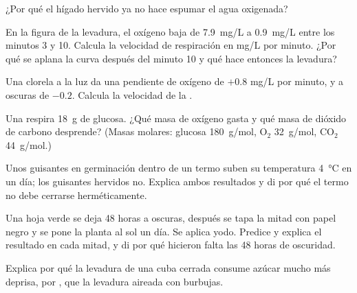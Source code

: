 \begin{exercise}[$\star$]\label{exo:g10:cell-metabolism:5}
¿Por qué el hígado hervido ya no hace espumar el agua oxigenada?
\end{exercise}

\begin{exercise}[$\star\star$]\label{exo:g10:cell-metabolism:6}
En la figura de la levadura, el oxígeno baja de \qty{7.9}{mg/L} a
\qty{0.9}{mg/L} entre los minutos 3 y 10. Calcula la velocidad de
respiración en \unit{mg/L} por minuto. ¿Por qué se aplana la curva
después del minuto 10 y qué hace entonces la levadura?
\end{exercise}

\begin{exercise}[$\star\star$]\label{exo:g10:cell-metabolism:7}
Una clorela a la luz da una pendiente de oxígeno de $+0.8$ \unit{mg/L}
por minuto, y a oscuras de $-0.2$. Calcula la velocidad de la
.
\end{exercise}

\begin{exercise}[$\star\star$]\label{exo:g10:cell-metabolism:8}
Una  respira \qty{18}{g} de glucosa. ¿Qué masa de oxígeno gasta y
qué masa de dióxido de carbono desprende? (Masas molares: glucosa
\qty{180}{g/mol}, $\mathrm{O_2}$ \qty{32}{g/mol}, $\mathrm{CO_2}$
\qty{44}{g/mol}.)
\end{exercise}

\begin{exercise}[$\star\star$]\label{exo:g10:cell-metabolism:9}
Unos guisantes en germinación dentro de un termo suben su temperatura
\qty{4}{\celsius} en un día; los guisantes hervidos no. Explica ambos
resultados y di por qué el termo no debe cerrarse herméticamente.
\end{exercise}

\begin{exercise}[$\star\star$]\label{exo:g10:cell-metabolism:10}
Una hoja verde se deja 48 horas a oscuras, después se tapa la mitad con
papel negro y se pone la planta al sol un día. Se aplica yodo. Predice
y explica el resultado en cada mitad, y di por qué hicieron falta las
48 horas de oscuridad.
\end{exercise}

\begin{exercise}[$\star\star$]\label{exo:g10:cell-metabolism:11}
Explica por qué la levadura de una cuba cerrada consume azúcar mucho
más deprisa, por , que la levadura aireada con burbujas.
\end{exercise}


